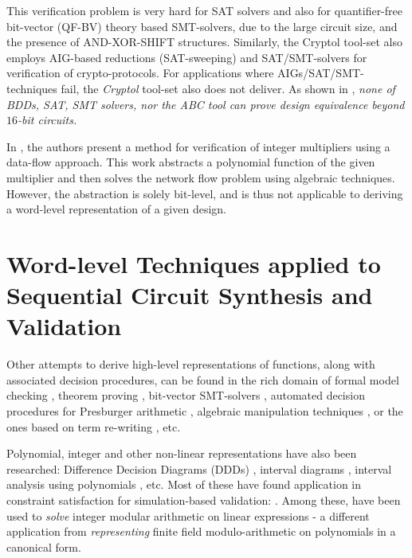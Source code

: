 This verification problem is very hard for SAT solvers and also for
quantifier-free bit-vector (QF-BV) theory based SMT-solvers, due to
the large circuit size, and the presence of AND-XOR-SHIFT structures. 
Similarly, the Cryptol tool-set \cite{Cryptol:fmcad09} also employs
AIG-based reductions (SAT-sweeping) and SAT/SMT-solvers for
verification of crypto-protocols. For applications where
AIGs/SAT/SMT-techniques fail, the {\it Cryptol} tool-set also does not
deliver. As shown in \cite{lv:phd}, {\it none of BDDs, SAT, SMT
  solvers, nor the  ABC tool can prove design equivalence beyond
  $16$-bit circuits.}

In \cite{ciesielski:flow}, the authors present a method
for verification of integer multipliers using a data-flow
approach. This work abstracts a polynomial function
of the given multiplier and then solves the network flow problem 
using algebraic techniques. However, the abstraction is 
solely bit-level, and is thus not applicable to deriving 
a word-level representation of a given design.

\section{Word-level Techniques applied to Sequential Circuit Synthesis and Validation}

Other attempts to derive high-level representations of functions,
along with associated decision procedures, can be found in
the rich domain of formal model checking \cite{BHEL96} \cite{SMV},
theorem proving \cite{arditi:bmd}, bit-vector SMT-solvers
\cite{boolector} \cite{cvc3} \cite{z3} \cite{bitvector98}, automated
decision procedures for Presburger arithmetic \cite{presburger}
\cite{bultan:mixed_verification}, algebraic manipulation techniques 
\cite{devadas:algebraic_manipulation_iccd91}, or the ones based on
term re-writing \cite{AST}, etc. %

Polynomial, integer and other non-linear representations have also
been researched: Difference Decision Diagrams (DDDs) \cite{ddd-csl99} \cite{ddd-mt-98}, interval
diagrams \cite{interval_dd}, interval analysis using polynomials
\cite{polynomial_sanchez99}, etc. Most of these have found 
application in constraint satisfaction for simulation-based
validation:  \cite{Ritter99} \cite{hsat} \cite{lpsat}
\cite{brinkmann:asp-dac} \cite{Huang:tcad01} \cite{bitvector98}. Among
these, \cite{brinkmann:asp-dac} \cite{Huang:tcad01} \cite{bitvector98}
have been used to {\it solve} integer modular arithmetic on linear
expressions - a different application from {\it representing}
finite field modulo-arithmetic on polynomials in a canonical form.   


